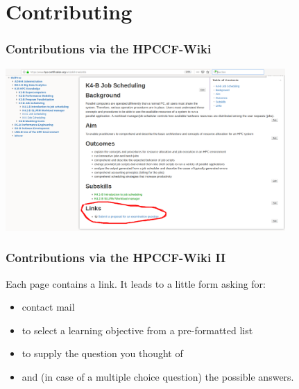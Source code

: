 \section[Contributing to the Question Pool]{Contributing}

\begin{frame}
  \frametitle{Contributions via the HPCCF-Wiki}
  \centering
  \includegraphics[width=0.8\textwidth]{images/contribution}
\end{frame}


\begin{frame}
  \frametitle{Contributions via the HPCCF-Wiki II}
  Each  page contains a link. It leads to a little form asking for:
  \begin{itemize}
   \item contact mail
   \item to select a learning objective from a pre-formatted list
   \item to supply the question you thought of
   \item and (in case of a multiple choice question) the possible answers.
  \end{itemize}
  \pause
\end{frame}


